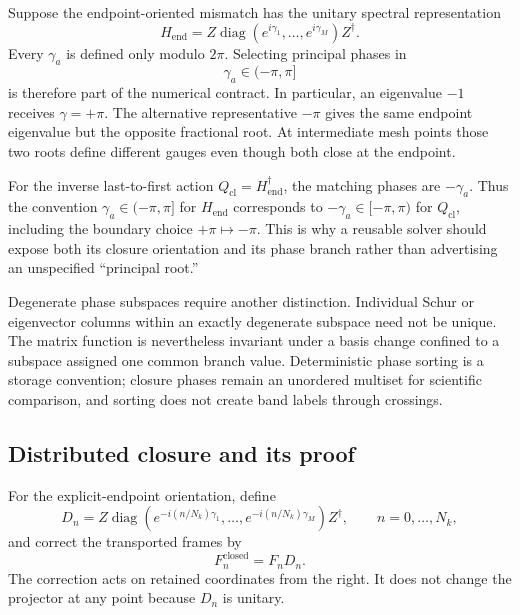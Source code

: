 Suppose the endpoint-oriented mismatch has the unitary spectral representation
\begin{equation}
  H_{\mathrm{end}}
  =Z\operatorname{diag}
   \left(e^{i\gamma_1},\ldots,e^{i\gamma_M}\right)Z^{\dagger}.
  \label{eq:training-composite-holonomy-spectrum}
\end{equation}
Every $\gamma_a$ is defined only modulo $2\pi$.  Selecting principal phases in
\begin{equation}
  \gamma_a\in(-\pi,\pi]
  \label{eq:training-composite-positive-pi-branch}
\end{equation}
is therefore part of the numerical contract.  In particular, an eigenvalue
$-1$ receives $\gamma=+\pi$.  The alternative representative $-\pi$ gives the
same endpoint eigenvalue but the opposite fractional root.  At intermediate
mesh points those two roots define different gauges even though both close at
the endpoint.

For the inverse last-to-first action $Q_{\mathrm{cl}}=H_{\mathrm{end}}^{\dagger}$,
the matching phases are $-\gamma_a$.  Thus the convention
$\gamma_a\in(-\pi,\pi]$ for $H_{\mathrm{end}}$ corresponds to
$-\gamma_a\in[-\pi,\pi)$ for $Q_{\mathrm{cl}}$, including the boundary choice
$+\pi\mapsto-\pi$.  This is why a reusable solver should expose both its closure
orientation and its phase branch rather than advertising an unspecified
``principal root.''

Degenerate phase subspaces require another distinction.  Individual Schur or
eigenvector columns within an exactly degenerate subspace need not be unique.
The matrix function is nevertheless invariant under a basis change confined to
a subspace assigned one common branch value.  Deterministic phase sorting is a
storage convention; closure phases remain an unordered multiset for scientific
comparison, and sorting does not create band labels through crossings.

\subsection{Distributed closure and its proof}

For the explicit-endpoint orientation, define
\begin{equation}
  D_n
  =Z\operatorname{diag}\left(
    e^{-i(n/N_k)\gamma_1},\ldots,
    e^{-i(n/N_k)\gamma_M}
  \right)Z^{\dagger},
  \qquad n=0,\ldots,N_k,
  \label{eq:training-composite-distributed-root}
\end{equation}
and correct the transported frames by
\begin{equation}
  F_n^{\mathrm{closed}}=F_nD_n.
  \label{eq:training-composite-closed-frame}
\end{equation}
The correction acts on retained coordinates from the right.  It does not
change the projector at any point because $D_n$ is unitary.

